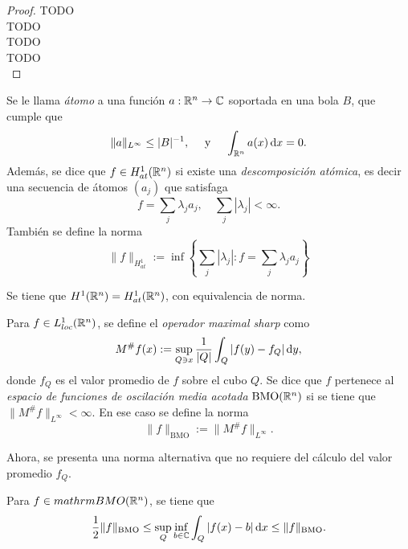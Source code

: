 \begin{proof}
	TODO\\
	TODO\\
	TODO\\
	TODO\\
\end{proof}
\begin{definition}
	Se le llama \textit{átomo} a una función $a:\mathbb{R}^n\to\mathbb{C}$ soportada en una bola $B$, que cumple que 
	\begin{equation*}
		\|a\|_{L^\infty} \leq |B|^{-1}, \quad \text{ y } \quad \int_{\mathbb{R}^n} a(x) \mathop{}\!\mathrm{d} x = 0.
	\end{equation*}
	Además, se dice que $f\in H^1_{at}(\mathbb{R}^n)$ si existe una \textit{descomposición atómica}, es decir una secuencia de átomos $(a_j)$ que satisfaga
	\begin{equation*}
		f = \sum_j \lambda_j a_j, \quad \sum_j |\lambda_j| < \infty.
	\end{equation*}
	También se define la norma 
	\begin{equation*}
		\|f\|_{H^1_{at}} := \inf \left\{\sum_j |\lambda_j| : f=\sum_j\lambda_j a_j \right\}
	\end{equation*}
\end{definition}
\begin{theorem}
	Se tiene que $H^1(\mathbb{R}^n) = H^1_{at}(\mathbb{R}^n)$, con equivalencia de norma.
\end{theorem}
\begin{definition}
	Para $f\in L^1_{loc}(\mathbb{R}^n)$, se define el \textit{operador maximal sharp} como
	\begin{equation*}
		M^\# f(x) := \sup_{Q\ni x} \frac{1}{|Q|}\int_Q |f(y)-f_Q| \mathop{}\!\mathrm{d} y,
	\end{equation*}
	donde $f_Q$ es el valor promedio de $f$ sobre el cubo $Q$. Se dice que $f$ pertenece al \textit{espacio de funciones de oscilación media acotada} $\mathrm{BMO}(\mathbb{R}^n)$ si se tiene que $\|M^\# f\|_{L^\infty} <\infty$. En ese caso se define la norma
	\begin{equation*}
		\|f\|_{\mathrm{BMO}} := \|M^\# f\|_{L^\infty}.
	\end{equation*}
\end{definition}
Ahora, se presenta una norma alternativa que no requiere del cálculo del valor promedio $f_Q$.
\begin{proposition}
	Para $f\in mathrm{BMO}(\mathbb{R}^n)$, se tiene que 
	\begin{equation*}
		\frac{1}{2}\|f\|_{\mathrm{BMO}} \leq \sup_Q \inf_{b\in\mathbb{C}} \int_Q |f(x)-b|\mathop{}\!\mathrm{d} x \leq \|f\|_{\mathrm{BMO}} . 
	\end{equation*}
\end{proposition}
